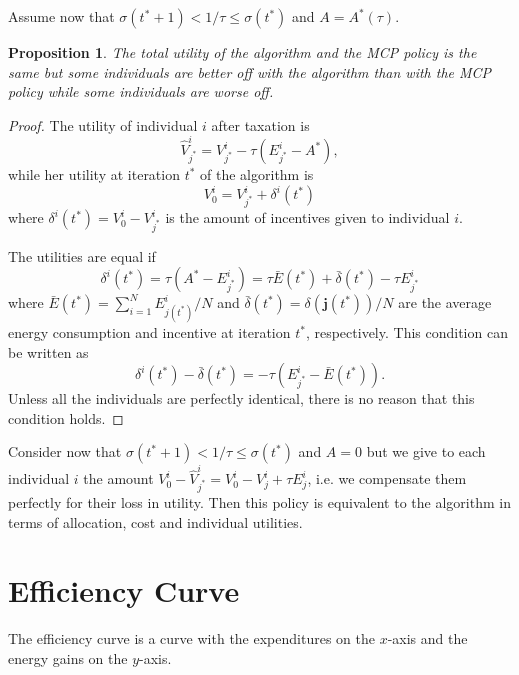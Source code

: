 \documentclass[empty, english]{javaudin}
\newtheorem{propo}{Proposition}
\begin{document}
Assume now that $\sigma(t^{*}+1) < 1 / \tau \leq \sigma(t^{*})$ and $A = A^{*} (\tau)$.

\begin{propo}
The total utility of the algorithm and the MCP policy is the same but some individuals are better off with the algorithm than with the MCP policy while some individuals are worse off.
\end{propo}

\begin{proof}
The utility of individual $i$ after taxation is
\begin{equation}
	\hat{V}^i_{j^{*}} = V^i_{j^{*}} - \tau(E^i_{j^{*}} - A^{*}),
\end{equation}
while her utility at iteration $t^{*}$ of the algorithm is
\begin{equation}
	V^i_0 = V^i_{j^{*}} + \delta^i(t^{*})
\end{equation}
where $\delta^i(t^{*}) = V^i_0 - V^i_{j^{*}}$ is the amount of incentives given to individual $i$.

The utilities are equal if
\begin{equation}
	\delta^i(t^{*}) = \tau (A^{*} - E^i_{j^{*}}) = \tau \bar{E}(t^{*}) + \bar{\delta}(t^{*}) - \tau E^i_{j^{*}}
\end{equation}
where $\bar{E}(t^{*}) = \sum^{N}_{i=1} E^i_{j(t^{*})} / N$ and $\bar{\delta}(t^{*}) = \delta(\mathbf{j}(t^{*})) / N$ are the average energy consumption and incentive at iteration $t^{*}$, respectively.
This condition can be written as
\begin{equation}
	\delta^i(t^{*}) - \bar{\delta}(t^{*}) = - \tau ( E^i_{j^{*}} - \bar{E}(t^{*})).
\end{equation}
Unless all the individuals are perfectly identical, there is no reason that this condition holds.
\end{proof}

Consider now that $\sigma(t^{*}+1) < 1 / \tau \leq \sigma(t^{*})$ and $A = 0$ but we give to each individual $i$ the amount $V_0^i - \hat{V}^i_{j^{*}} = V^i_0 - V^i_j + \tau E^i_j$, i.e. we compensate them perfectly for their loss in utility.
Then this policy is equivalent to the algorithm in terms of allocation, cost and individual utilities.

\section{Efficiency Curve}
\label{sec:Efficiency Curve}

The efficiency curve is a curve with the expenditures on the $x$-axis and the energy gains on the $y$-axis.
\end{document}
